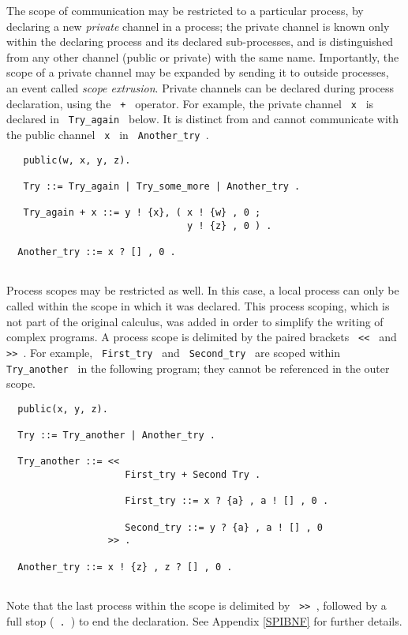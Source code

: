 The scope of communication may be restricted to a particular process,
by declaring a new {\em private} channel in a process; the private
channel is known only
within the declaring process and its declared sub-processes, and is
distinguished from any other channel (public or private) with the same
name.  Importantly, the scope of a private channel may be expanded by
sending it to outside processes, an event called {\em scope extrusion}. 
Private channels can be declared during process declaration, using the
\verb- + - operator.  For example, the private channel \verb+ x + is
declared in \verb+ Try_again + below. It is distinct from and cannot 
communicate with the public channel \verb+ x + in \verb+ Another_try +.

\begin{verbatim}
   public(w, x, y, z).

   Try ::= Try_again | Try_some_more | Another_try .

   Try_again + x ::= y ! {x}, ( x ! {w} , 0 ;
                                y ! {z} , 0 ) .

  Another_try ::= x ? [] , 0 .
 
\end{verbatim}

Process scopes may be restricted as well. In this case, a local
process can only be called within the scope in which it was
declared. This process scoping, which is not part of the original
calculus, was added in order to simplify the writing of complex
programs.  A process scope is delimited by the paired brackets
\verb+ << + and \verb+ >> +.  For example, \verb+ First_try + and
\verb+ Second_try + are scoped within \verb+ Try_another + in the
following program; they cannot be referenced in the outer scope.

\begin{verbatim}
  public(x, y, z).

  Try ::= Try_another | Another_try .

  Try_another ::= << 
                     First_try + Second Try .

                     First_try ::= x ? {a} , a ! [] , 0 .

                     Second_try ::= y ? {a} , a ! [] , 0 
                  >> .

  Another_try ::= x ! {z} , z ? [] , 0 .
 
\end{verbatim}

\noindent

Note that the last process within the scope is delimited by \verb+ >> +,
followed by a full stop (\verb+ . +) to end the declaration.  See
Appendix \ref{SPIBNF} for further details.


